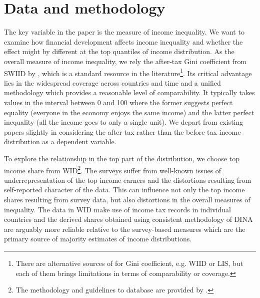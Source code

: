 \documentclass[preprint, nonatbib, 10pt]{elsarticle}
\begin{document}

%
%
%
%
%

\section{Data and methodology}
The key variable in the paper is the measure of income inequality. We want to examine how financial development affects income inequality and whether the effect might by different at the top quantiles of income distribution. As the overall measure of income inequality, we rely the after-tax Gini coefficient from \ac{SWIID} by \textcite{Solt2019}, which is a standard resource in the literature\footnote{There are alternative sources of for Gini coefficient, e.g. \ac{WIID} or \ac{LIS}, but each of them brings limitations in terms of comparability or coverage.}. Its critical advantage lies in the widespread coverage across countries and time and a unified methodology which provides a reasonable level of comparability. It typically takes values in the interval between 0 and 100 where the former suggests perfect equality (everyone in the economy enjoys the same income) and the latter perfect inequality (all the income goes to only a single unit). We depart from existing papers slightly in considering the after-tax rather than the before-tax income distribution as a dependent variable. 

To explore the relationship in the top part of the distribution, we choose top income share from \ac{WID}\footnote{The methodology and guidelines to database are provided by \textcite{alvaredo2016distributional}.}. The surveys suffer from well-known issues of underrepresentation of the top income earners and the distortions resulting from self-reported character of the data. This can influence not only the top income shares resulting from survey data, but also distortions in the overall measures of inequality. The data in \ac{WID} make use of income tax records in individual countries and the derived shares obtained using consistent methodology of \ac{DINA} are arguably more reliable relative to the survey-based measures which are the primary source of majority estimates of income distributions. 
\end{document}
